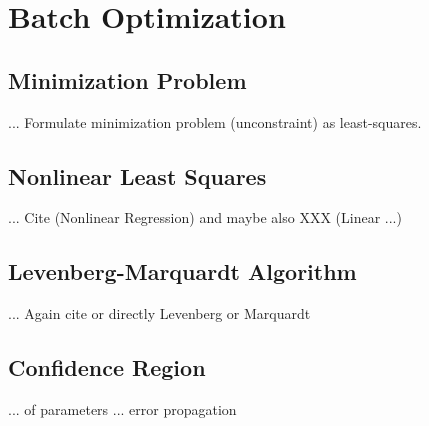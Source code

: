 \chapter{Batch Optimization}
\label{chap:batch}

\section{Minimization Problem}
... Formulate minimization problem (unconstraint) as least-squares.

\section{Nonlinear Least Squares}
... Cite \cite{Seber} (Nonlinear Regression) and maybe also XXX (Linear ...)

\section{Levenberg-Marquardt Algorithm}
... Again cite \cite{Seber} or directly Levenberg or Marquardt

\section{Confidence Region}
... of parameters
... error propagation

